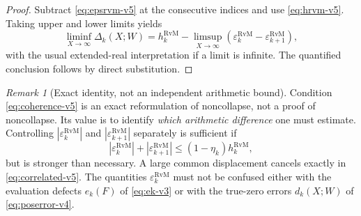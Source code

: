 \documentclass[11pt,a4paper]{article}
\numberwithin{equation}{section}
\theoremstyle{definition}
\theoremstyle{remark}
\newtheorem{remark}[theorem]{Remark}
\begin{document}
\begin{proof}
Subtract \eqref{eq:epsrvm-v5} at the consecutive indices and
use \eqref{eq:hrvm-v5}.  Taking upper and lower limits yields
\begin{equation}
 \liminf_{X\to\infty}\Delta_k(X;W)
 =h_k^{\mathrm{RvM}}-
 \limsup_{X\to\infty}
 (\varepsilon_k^{\mathrm{RvM}}-
  \varepsilon_{k+1}^{\mathrm{RvM}}),
\end{equation}
with the usual extended-real interpretation if a limit is infinite.
The quantified conclusion follows by direct substitution.
\end{proof}
\begin{remark}[Exact identity, not an independent arithmetic bound]
Condition \eqref{eq:coherence-v5} is an exact reformulation of
noncollapse, not a proof of noncollapse.  Its value is to identify
\emph{which arithmetic difference} one must estimate.  Controlling
$|\varepsilon_k^{\mathrm{RvM}}|$ and
$|\varepsilon_{k+1}^{\mathrm{RvM}}|$ separately is sufficient if
\begin{equation}
 |\varepsilon_k^{\mathrm{RvM}}|+
 |\varepsilon_{k+1}^{\mathrm{RvM}}|
 \le(1-\eta_k)h_k^{\mathrm{RvM}},
\end{equation}
but is stronger than necessary.  A large common displacement cancels
exactly in \eqref{eq:correlated-v5}.  The quantities
$\varepsilon_k^{\mathrm{RvM}}$ must not be confused either with the
evaluation defects $e_k(F)$ of \eqref{eq:ek-v3} or with the
true-zero errors $d_k(X;W)$ of \eqref{eq:poserror-v4}.
\end{remark}
\end{document}
